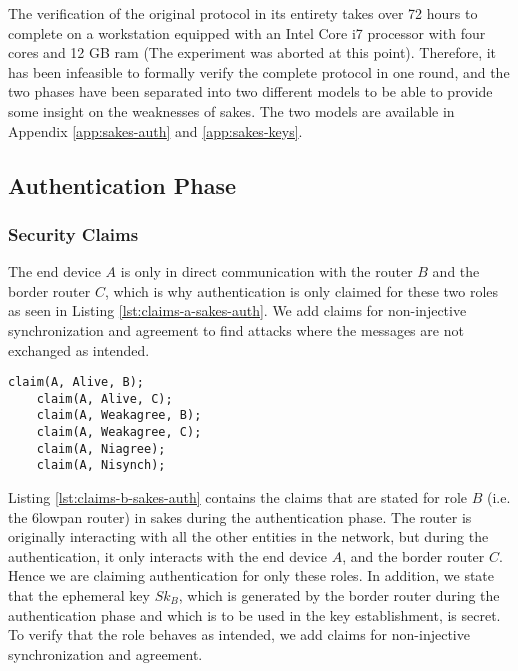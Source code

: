 The verification of the original protocol in its entirety takes over 72 hours to complete on a workstation equipped with an Intel Core i7 processor with four cores and 12 GB \gls{ram} (The experiment was aborted at this point). Therefore, it has been infeasible to formally verify the complete protocol in one round, and the two phases have been separated into two different models to be able to provide some insight on the weaknesses of \gls{sakes}. The two models are available in Appendix \ref{app:sakes-auth} and \ref{app:sakes-keys}.


\subsection{Authentication Phase}
\label{subsec:sakes-auth}

\subsubsection{Security Claims}

The end device $A$ is only in direct communication with the router $B$ and the border router $C$, which is why authentication is only claimed for these two roles as seen in Listing \ref{lst:claims-a-sakes-auth}. We add claims for non-injective synchronization and agreement to find attacks where the messages are not exchanged as intended.\\

\begin{lstlisting}[caption={Security claims for role A during the authentication phase in SAKES.}, label={lst:claims-a-sakes-auth}, style=code-listings]
	claim(A, Alive, B);
	claim(A, Alive, C);
	claim(A, Weakagree, B);
	claim(A, Weakagree, C);
	claim(A, Niagree);
	claim(A, Nisynch);
\end{lstlisting}


Listing \ref{lst:claims-b-sakes-auth} contains the claims that are stated for role $B$ (i.e. the \gls{6lowpan} router) in \gls{sakes} during the authentication phase. The router is originally interacting with all the other entities in the network, but during the authentication, it only interacts with the end device $A$, and the border router $C$. Hence we are claiming authentication for only these roles. In addition, we state that the ephemeral key $Sk_B$, which is generated by the border router during the authentication phase and which is to be used in the key establishment, is secret. To verify that the role behaves as intended, we add claims for non-injective synchronization and agreement.\\

